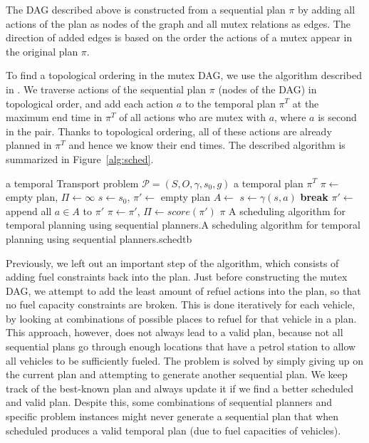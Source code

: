 The DAG described above is constructed
from a sequential plan $\pi$ by adding
all actions of the plan as nodes of the graph
and all mutex relations as edges.
The direction of added edges is based on the order
the actions of a mutex appear in the original plan $\pi$.

To find a topological ordering in the mutex DAG,
we use the algorithm described in \citet{Kahn1962}.
We traverse actions of the sequential plan $\pi$
(nodes of the DAG)
in topological order, and add each action $a$
to the temporal plan $\pi^T$
at the maximum end time in $\pi^T$ of all actions
who are mutex with $a$, where $a$ is second in the pair.
Thanks to topological ordering, all of these actions
are already planned in $\pi^T$ and hence we know their end times.
The described algorithm is summarized in Figure~\ref{alg:sched}.

%
{%
\Input a temporal Transport problem $\mathcal{P} = (S, O, \gamma, s_0, g)$
\Output a temporal plan $\pi^T$
\State $\pi \gets $ empty plan, $\Pi \gets \infty$
 
\State $s \gets s_0$, $\pi' \gets $ empty plan
\State $A \gets $ 
 
\State $s \gets \gamma(s, a)$
\EndFor
{} \textbf{break} 
\EndIf
\State $\pi' \gets $ append all $a \in A$ to $\pi'$
\EndWhile
{}
\State $\pi \gets \pi'$, $\Pi \gets score(\pi')$ 
\EndIf
\EndWhile
\State \Return $\pi$
\EndFunction
}%
{A scheduling algorithm
for temporal planning using sequential planners.}{A scheduling algorithm
for temporal planning using sequential planners.}{sched}{tb}

Previously, we left out an important step of the algorithm,
which consists of adding fuel constraints back into the plan.
Just before constructing the mutex DAG,
we attempt to add the least amount of refuel actions
into the plan, so that no fuel capacity constraints are broken.
This is done iteratively for each vehicle,
by looking at combinations of possible places to refuel for that vehicle in a plan.
This approach, however, does not always lead to a valid plan,
because not all
sequential plans go through enough locations that have a petrol station
to allow all vehicles to be sufficiently fueled.
The problem is solved by simply giving up on the current plan
and attempting to generate another sequential plan.
We keep track of the best-known plan and always update it
if we find a better scheduled and valid plan.
Despite this, some combinations of sequential planners
and specific problem instances might never generate a sequential plan
that when scheduled produces a valid temporal plan (due to fuel capacities of vehicles).

